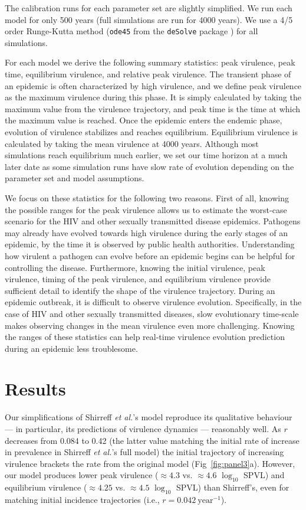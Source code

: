 \documentclass[10pt,letterpaper]{article}
\renewcommand{\figurename}{Fig}
\newcommand{\Lspvl}{$\log_{10}$ SPVL}
\newcommand{\etal}{\textit{et al.}}
\begin{document}
The calibration runs for each parameter set are slightly
simplified. We run each model for only 500 years
(full simulations are run for 4000 years). We use a 4/5 order 
Runge-Kutta method (\texttt{ode45} from the \texttt{deSolve} package
\cite{soetaert_solving_2010}) for all simulations.

For each model we derive the following summary statistics: peak virulence, peak time, equilibrium virulence, and relative peak virulence. The transient phase of an epidemic is often characterized by high virulence, and we define peak virulence as the maximum virulence during this phase. It is simply calculated by taking the maximum value from the virulence trajectory, and peak time is the time at which the maximum value is reached. Once the epidemic enters the endemic phase, evolution of virulence stabilizes and reaches equilibrium. Equilibrium virulence is calculated by taking the mean virulence at 4000 years. Although most simulations reach equilibrium much earlier, we set our time horizon at a much later date as some simulation runs have slow rate of evolution depending on the parameter set and model assumptions.

We focus on these statistics for the following two reasons. First of all, knowing the possible ranges for the peak virulence allows us to estimate the worst-case scenario for the HIV and other sexually transmitted disease epidemics. Pathogens may already have evolved towards high virulence during the early stages of an epidemic, by the time it is observed by public health authorities. Understanding how virulent a pathogen can evolve before an epidemic begins can be helpful for controlling the disease. Furthermore, knowing the initial virulence, peak virulence, timing of the peak virulence, and equilibrium virulence provide sufficient detail to identify the shape of the virulence trajectory. During an epidemic outbreak, it is difficult to observe virulence evolution. Specifically, in the case of HIV and other sexually transmitted diseases, slow evolutionary time-scale makes observing changes in the mean virulence even more challenging. Knowing the ranges of these statistics can help real-time virulence evolution prediction during an epidemic less troublesome.

\section*{Results}

Our simplifications of Shirreff \etal's model \cite{shirreff_transmission_2011} reproduce its qualitative behaviour --- in particular, its predictions of virulence dynamics --- reasonably well. As $r$ decreases from 0.084 to 0.42 (the latter value matching the initial rate of increase in prevalence in Shirreff \etal's full model) the initial trajectory of increasing virulence brackets the rate from the original model (\figurename~\ref{fig:panel3}a). However, our model produces lower peak virulence ($\approx 4.3$ vs. $\approx 4.6$ \Lspvl) 
and equilibrium virulence ($\approx 4.25$ vs. $\approx 4.5$ \Lspvl) than Shirreff's, even for matching initial incidence trajectories (i.e., $r=0.042~\textrm{year}^{-1}$).
\end{document}
